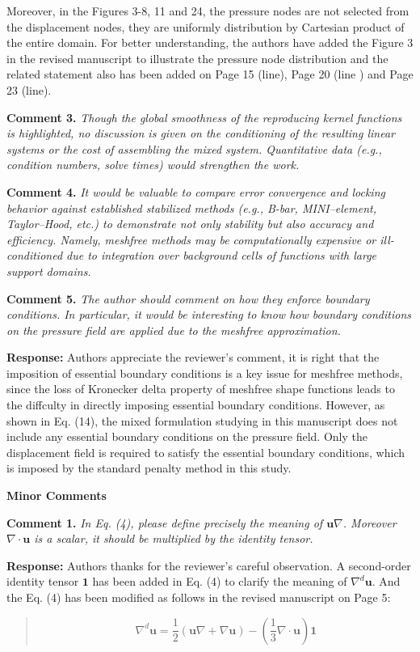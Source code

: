 \documentclass{article}
\begin{document}
Moreover, in the Figures 3-8, 11 and 24, the pressure nodes are not selected from the displacement nodes,
they are uniformly distribution by Cartesian product of the entire domain. 
For better understanding, the authors have added the Figure 3 in the revised manuscript to illustrate the pressure node distribution and the related statement also has been added on Page 15 (line), Page 20 (line ) and Page 23 (line).

\textbf{Comment 3.} \textit{
Though the global smoothness of the reproducing kernel functions is highlighted, no discussion is given on the conditioning of the resulting linear systems or the cost of assembling the mixed system. Quantitative data (e.g., condition numbers, solve times) would strengthen the work.
}

\textbf{Comment 4.} \textit{
It would be valuable to compare error convergence and locking behavior against established stabilized methods (e.g., B-bar, MINI–element, Taylor–Hood, etc.) to demonstrate not only stability but also accuracy and efficiency. Namely, meshfree methods may be computationally expensive or ill-conditioned due to integration over background cells of functions with large support domains.
}

\textbf{Comment 5.} \textit{
The author should comment on how they enforce boundary conditions. In particular, it would be interesting to know how boundary conditions on the pressure field are applied due to the meshfree approximation.
}

\textbf{Response:} Authors appreciate the reviewer's comment, it is right that the imposition of essential boundary conditions is a key issue for meshfree methods, since the loss of Kronecker delta property of meshfree shape functions leads to the diffculty in directly imposing essential boundary conditions.
However, as shown in Eq. (14), the mixed formulation studying in this manuscript does not include any essential boundary conditions on the pressure field. Only the displacement field is required to satisfy the essential boundary conditions, which is imposed by the standard penalty method in this study.

\noindent\textbf{Minor Comments}

\textbf{Comment 1.} \textit{
In Eq. (4), please define precisely the meaning of $\boldsymbol u\nabla$. Moreover $\nabla \cdot \boldsymbol u$ is a scalar, it should be multiplied by the identity tensor.
}

\textbf{Response:} Authors thanks for the reviewer's careful observation.
A second-order identity tensor $\boldsymbol 1$ has been added in Eq. (4) to clarify the meaning of $\nabla^d \boldsymbol u$. 
And the Eq. (4) has been modified as follows in the revised manuscript on Page 5:
\begin{quote}
\begin{equation}
\nabla^d \boldsymbol{u} = \frac{1}{2}(\boldsymbol{u} \nabla + \nabla \boldsymbol{u}) - (\frac{1}{3} \nabla \cdot \boldsymbol{u}) \boldsymbol{1}
\end{equation}
\end{quote}
\end{document}
